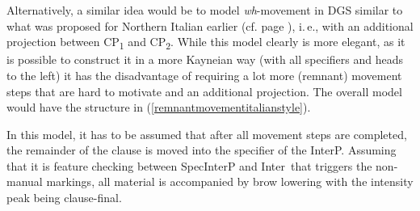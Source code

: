 Alternatively, a similar idea would be to model \textit{wh}-movement in DGS similar to what was proposed for Northern Italian earlier (cf. page \pageref{italianwhdoublinga}), i.\,e., with an additional projection between CP\textsubscript{1} and CP\textsubscript{2}. While this model clearly is more elegant, as it is possible to construct it in a more Kayneian way (with all specifiers and heads to the left) it has the disadvantage of requiring a lot more (remnant) movement steps that are hard to motivate and an additional projection. The overall model would have the structure in (\ref{remnantmovementitalianstyle}).%

In this model, it has to be assumed that after all movement steps are completed, the remainder of the clause is moved into the specifier of the InterP. Assuming that it is feature checking between SpecInterP and Inter\textdegree\ that triggers the non-manual markings, all material is accompanied by brow lowering with the intensity peak being clause-final. 

\vspace{-0.3cm}

\begin{exe}
\ex\label{remnantmovementitalianstyle}
\begin{adjustbox}{max width=0.90\textwidth}
\end{adjustbox}
\end{exe}


